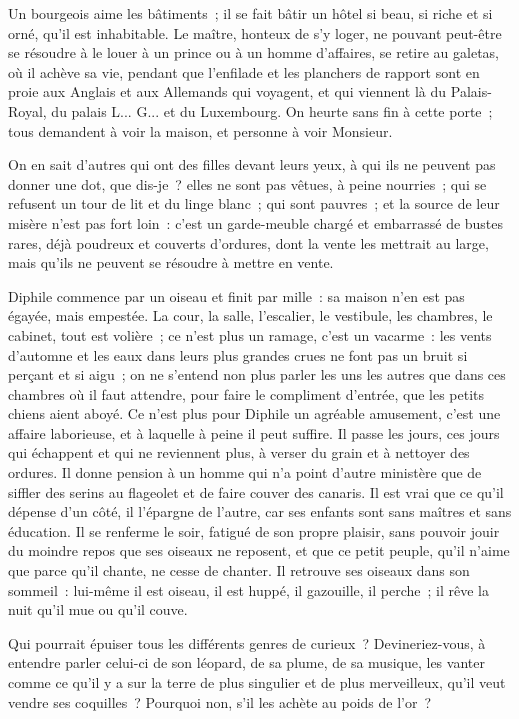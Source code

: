 \documentclass[french,twoside]{book} %
\begin{document}
Un bourgeois aime les bâtiments ; il se fait bâtir un hôtel si beau, si riche et si orné, qu’il est inhabitable. Le maître, honteux de s’y loger, ne pouvant peut-être se résoudre à le louer à un prince ou à un homme d’affaires, se retire au galetas, où il achève sa vie, pendant que l’enfilade et les planchers de rapport sont en proie aux Anglais et aux Allemands qui voyagent, et qui viennent là du Palais-Royal, du palais L... G... et du Luxembourg. On heurte sans fin à cette porte ; tous demandent à voir la maison, et personne à voir Monsieur.\par
On en sait d’autres qui ont des filles devant leurs yeux, à qui ils ne peuvent pas donner une dot, que dis-je ? elles ne sont pas vêtues, à peine nourries ; qui se refusent un tour de lit et du linge blanc ; qui sont pauvres ; et la source de leur misère n’est pas fort loin : c’est un garde-meuble chargé et embarrassé de bustes rares, déjà poudreux et couverts d’ordures, dont la vente les mettrait au large, mais qu’ils ne peuvent se résoudre à mettre en vente.\par
Diphile commence par un oiseau et finit par mille : sa maison n’en est pas égayée, mais empestée. La cour, la salle, l’escalier, le vestibule, les chambres, le cabinet, tout est volière ; ce n’est plus un ramage, c’est un vacarme : les vents d’automne et les eaux dans leurs plus grandes crues ne font pas un bruit si perçant et si aigu ; on ne s’entend non plus parler les uns les autres que dans ces chambres où il faut attendre, pour faire le compliment d’entrée, que les petits chiens aient aboyé. Ce n’est plus pour Diphile un agréable amusement, c’est une affaire laborieuse, et à laquelle à peine il peut suffire. Il passe les jours, ces jours qui échappent et qui ne reviennent plus, à verser du grain et à nettoyer des ordures. Il donne pension à un homme qui n’a point d’autre ministère que de siffler des serins au flageolet et de faire couver des canaris. Il est vrai que ce qu’il dépense d’un côté, il l’épargne de l’autre, car ses enfants sont sans maîtres et sans éducation. Il se renferme le soir, fatigué de son propre plaisir, sans pouvoir jouir du moindre repos que ses oiseaux ne reposent, et que ce petit peuple, qu’il n’aime que parce qu’il chante, ne cesse de chanter. Il retrouve ses oiseaux dans son sommeil : lui-même il est oiseau, il est huppé, il gazouille, il perche ; il rêve la nuit qu’il mue ou qu’il couve.\par
Qui pourrait épuiser tous les différents genres de curieux ? Devineriez-vous, à entendre parler celui-ci de son léopard, de sa plume, de sa musique, les vanter comme ce qu’il y a sur la terre de plus singulier et de plus merveilleux, qu’il veut vendre ses coquilles ? Pourquoi non, s’il les achète au poids de l’or ?\par
\end{document}
